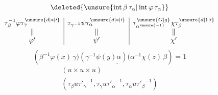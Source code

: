 \[
 \deleted{\unsure{\operatorname{int}\beta\,\tau_\alpha|\operatorname{int}\varphi\,\tau_{\alpha}}}
\]
\[
 \begin{array}{c|c|c}
 \tau_{\beta}^{-1}\varphi\tau_{\gamma}^{\unsure{d|*|\prime}}&
 \tau_{\gamma^{-1}}\psi\tau_{\alpha}^{\unsure{d|*|\prime}}&
 \tau_{\alpha^{\unsure{-1}}}^{\unsure{G|g}}\chi\tau_{\beta}^{\unsure{d|1|\prime}}\\
 \Vert&\Vert&\Vert\\ \varphi'&\psi'&\chi'
 \end{array}
\]
\[
 (\beta^{-1}\varphi(x)\,\underline{\gamma)(\gamma^{-1}\psi(y)\alpha)(\alpha^{-1}\chi(z)}\,\beta)=1
\]
\[
 \begin{gathered}
 (u\times u\times u)\\
 (\tau_\beta u{\tau'_\gamma}^{-1},\tau_\gamma u{\tau'_\alpha}^{-1},\tau_\alpha u{\tau'_\beta}^{-1})
 \end{gathered}
\]
